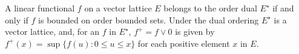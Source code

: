 A linear functional $f$ on a vector lattice $E$ belongs to the order dual $E^{\star}$ if and only if $f$ is bounded on order bounded sets. Under the dual ordering $E^{\star}$ is a vector lattice, and, for an $f$ in $E^{\star}$, $f^{+} = f \lor 0$ is given by $f^{+}(x) = \sup \{f(u): 0 \leq u \leq x\}$ for each positive element $x$ in $E$.
